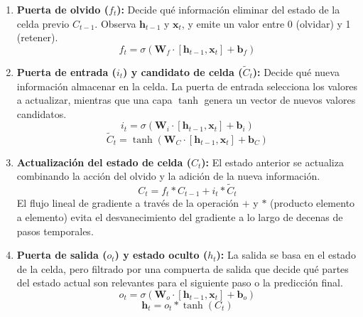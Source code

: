 \begin{enumerate}
    \item \textbf{Puerta de olvido (\(f_t\)):} Decide qué información eliminar del estado de la celda previo \(C_{t-1}\). Observa \(\mathbf{h}_{t-1}\) y \(\mathbf{x}_t\), y emite un valor entre 0 (olvidar) y 1 (retener).
    \begin{equation}
        f_t = \sigma(\mathbf{W}_f \cdot [\mathbf{h}_{t-1}, \mathbf{x}_t] + \mathbf{b}_f)
    \end{equation}
    
    \item \textbf{Puerta de entrada (\(i_t\)) y candidato de celda (\(\tilde{C}_t\)):} Decide qué nueva información almacenar en la celda. La puerta de entrada selecciona los valores a actualizar, mientras que una capa \(\tanh\) genera un vector de nuevos valores candidatos.
    \begin{equation}
        i_t = \sigma(\mathbf{W}_i \cdot [\mathbf{h}_{t-1}, \mathbf{x}_t] + \mathbf{b}_i)
    \end{equation}
    \begin{equation}
        \tilde{C}_t = \tanh(\mathbf{W}_C \cdot [\mathbf{h}_{t-1}, \mathbf{x}_t] + \mathbf{b}_C)
    \end{equation}
    
    \item \textbf{Actualización del estado de celda (\(C_t\)):} El estado anterior se actualiza combinando la acción del olvido y la adición de la nueva información.
    \begin{equation}
        C_t = f_t * C_{t-1} + i_t * \tilde{C}_t
    \end{equation}
    El flujo lineal de gradiente a través de la operación \(+\) y \(*\) (producto elemento a elemento) evita el desvanecimiento del gradiente a lo largo de decenas de pasos temporales.

    \item \textbf{Puerta de salida (\(o_t\)) y estado oculto (\(h_t\)):} La salida se basa en el estado de la celda, pero filtrado por una compuerta de salida que decide qué partes del estado actual son relevantes para el siguiente paso o la predicción final.
    \begin{equation}
        o_t = \sigma(\mathbf{W}_o \cdot [\mathbf{h}_{t-1}, \mathbf{x}_t] + \mathbf{b}_o)
    \end{equation}
    \begin{equation}
        \mathbf{h}_t = o_t * \tanh(C_t)
    \end{equation}
\end{enumerate}

